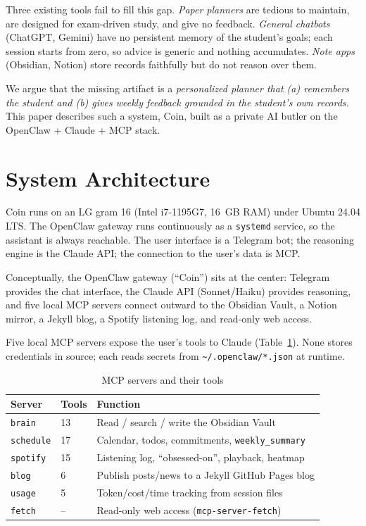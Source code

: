 \documentclass[conference]{IEEEtran}
\begin{document}
Three existing tools fail to fill this gap. \emph{Paper planners} are tedious to
maintain, are designed for exam-driven study, and give no feedback. \emph{General
chatbots} (ChatGPT, Gemini) have no persistent memory of the student's goals; each
session starts from zero, so advice is generic and nothing accumulates.
\emph{Note apps} (Obsidian, Notion) store records faithfully but do not reason over
them.

We argue that the missing artifact is a \emph{personalized planner that (a)
remembers the student and (b) gives weekly feedback grounded in the student's own
records.} This paper describes such a system, Coin, built as a private AI butler
on the OpenClaw + Claude + MCP stack.

\section{System Architecture}
Coin runs on an LG gram 16 (Intel i7-1195G7, 16~GB RAM) under Ubuntu 24.04 LTS.
The OpenClaw gateway runs continuously as a \texttt{systemd} service, so the
assistant is always reachable. The user interface is a Telegram bot; the reasoning
engine is the Claude API; the connection to the user's data is MCP.

Conceptually, the OpenClaw gateway (``Coin'') sits at the center: Telegram provides
the chat interface, the Claude API (Sonnet/Haiku) provides reasoning, and five
local MCP servers connect outward to the Obsidian Vault, a Notion mirror, a Jekyll
blog, a Spotify listening log, and read-only web access.

Five local MCP servers expose the user's tools to Claude
(Table~\ref{tab:mcp}). None stores credentials in source; each reads secrets from
\texttt{\textasciitilde/.openclaw/*.json} at runtime.

\begin{table}[t]
\caption{MCP servers and their tools}
\label{tab:mcp}
\centering
\footnotesize
\begin{tabular}{@{}llp{4.6cm}@{}}
\toprule
\textbf{Server} & \textbf{Tools} & \textbf{Function} \\
\midrule
\texttt{brain}    & 13 & Read / search / write the Obsidian Vault \\
\texttt{schedule} & 17 & Calendar, todos, commitments, \texttt{weekly\_summary} \\
\texttt{spotify}  & 15 & Listening log, ``obsessed-on'', playback, heatmap \\
\texttt{blog}     & 6  & Publish posts/news to a Jekyll GitHub Pages blog \\
\texttt{usage}    & 5  & Token/cost/time tracking from session files \\
\texttt{fetch}    & -- & Read-only web access (\texttt{mcp-server-fetch}) \\
\bottomrule
\end{tabular}
\end{table}
\end{document}
